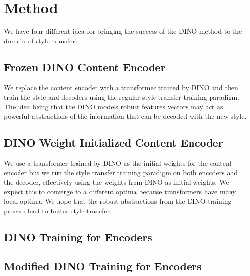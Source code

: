 \documentclass{article}
\begin{document}
\section{Method}

We have four different idea for bringing the success of the DINO method to the domain of style transfer.

\subsection{Frozen DINO Content Encoder}

We replace the content encoder with a transformer trained by DINO and then train the style and decoders using the regular style transfer training paradigm. The idea being that the DINO models robust features vectors may act as powerful abstractions of the information that can be decoded with the new style.

\subsection{DINO Weight Initialized Content Encoder}

We use a transformer trained by DINO as the initial weights for the content encoder but we run the style transfer training paradigm on both encoders and the decoder, effectively using the weights from DINO as initial weights. We expect this to converge to a different optima because transformers have many local optima. We hope that the robust abstractions from the DINO training process lead to better style transfer.

\subsection{DINO Training for Encoders}



\subsection{Modified DINO Training for Encoders}



\medskip

\nocite{*}


\end{document}
